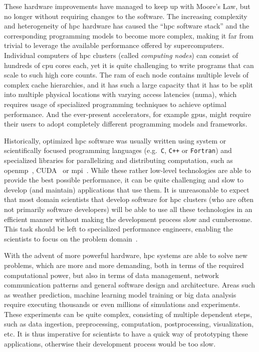 These hardware improvements have managed to keep up with Moore's Law, but no longer without
requiring changes to the software. The increasing complexity and heterogeneity of
\gls{hpc} hardware has caused the ``\gls{hpc} software stack'' and the
corresponding programming models to become more complex, making it far from trivial to leverage the
available performance offered by supercomputers. Individual computers of \gls{hpc}
clusters (called \emph{computing nodes}) can consist of hundreds of \gls{cpu} cores
each, yet it is quite challenging to write programs that can scale to such high core counts. The
\gls{ram} of each node contains multiple levels of complex cache
hierarchies, and it has such a large capacity that it has to be split into multiple physical
locations with varying access latencies (\gls{numa}), which requires usage of
specialized programming techniques to achieve optimal performance. And the ever-present
accelerators, for example \glspl{gpu}, might require their users to adopt completely
different programming models and frameworks.

Historically, optimized \gls{hpc} software was usually written using system or
scientifically focused programming languages (e.g.~\texttt{C}, \texttt{C++}
or \texttt{Fortran}) and specialized libraries for parallelizing and distributing
computation, such as \gls{openmp}~\cite{openmp}, CUDA~\cite{cuda} or
\gls{mpi}~\cite{mpistudy}. While these rather low-level technologies are able
to provide the best possible performance, it can be quite challenging and slow to develop (and
maintain) applications that use them. It is unreasonable to expect that most domain scientists that
develop software for \gls{hpc} clusters (who are often not primarily software
developers) will be able to use all these technologies in an efficient manner without making the
development process slow and cumbersome. This task should be left to specialized performance
engineers, enabling the scientists to focus on the problem domain~\cite{dace}.

With the advent of more powerful hardware, \gls{hpc} systems are able to solve new
problems, which are more and more demanding, both in terms of the required computational power, but
also in terms of data management, network communication patterns and general software design and
architecture. Areas such as weather prediction, machine learning model training or big data
analysis require executing thousands or even millions of simulations and experiments. These
experiments can be quite complex, consisting of multiple dependent steps, such as data ingestion,
preprocessing, computation, postprocessing, visualization, etc. It is thus imperative for
scientists to have a quick way of prototyping these applications, otherwise their development
process would be too slow.

